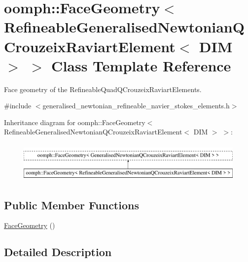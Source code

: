 \hypertarget{classoomph_1_1FaceGeometry_3_01RefineableGeneralisedNewtonianQCrouzeixRaviartElement_3_01DIM_01_4_01_4}{}\section{oomph\+:\+:Face\+Geometry$<$ Refineable\+Generalised\+Newtonian\+Q\+Crouzeix\+Raviart\+Element$<$ D\+IM $>$ $>$ Class Template Reference}
\label{classoomph_1_1FaceGeometry_3_01RefineableGeneralisedNewtonianQCrouzeixRaviartElement_3_01DIM_01_4_01_4}


Face geometry of the Refineable\+Quad\+Q\+Crouzeix\+Raviart\+Elements.  




{\ttfamily \#include $<$generalised\+\_\+newtonian\+\_\+refineable\+\_\+navier\+\_\+stokes\+\_\+elements.\+h$>$}

Inheritance diagram for oomph\+:\+:Face\+Geometry$<$ Refineable\+Generalised\+Newtonian\+Q\+Crouzeix\+Raviart\+Element$<$ D\+IM $>$ $>$\+:\begin{figure}[H]
\begin{center}
\leavevmode
\includegraphics[height=2.000000cm]{classoomph_1_1FaceGeometry_3_01RefineableGeneralisedNewtonianQCrouzeixRaviartElement_3_01DIM_01_4_01_4}
\end{center}
\end{figure}
\subsection*{Public Member Functions}
\begin{DoxyCompactItemize}
\item 
\hyperlink{classoomph_1_1FaceGeometry_3_01RefineableGeneralisedNewtonianQCrouzeixRaviartElement_3_01DIM_01_4_01_4_a553676a80105e5caf521e22aa56388b2}{Face\+Geometry} ()
\end{DoxyCompactItemize}


\subsection{Detailed Description}
